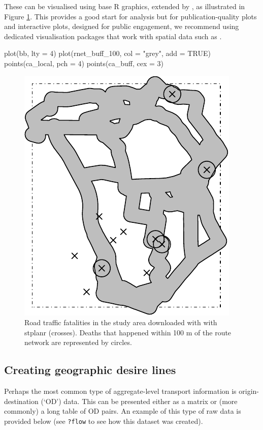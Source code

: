 These can be visualised using base R graphics, extended by ,
as illustrated in Figure \ref{fig:fats}. This provides a good start for
analysis but for publication-quality plots and interactive plots,
designed for public engagement, we recommend using dedicated
visualisation packages that work with spatial data such as
.

\begin{Schunk}
\begin{Sinput}
plot(bb, lty = 4)
plot(rnet_buff_100, col = "grey", add = TRUE)
points(ca_local, pch = 4)
points(ca_buff, cex = 3)
\end{Sinput}
\begin{figure}

{\centering \includegraphics[width=0.5\linewidth]{fats-1}

}

\caption[Road traffic fatalities in the study area downloaded with with stplanr (crosses)]{Road traffic fatalities in the study area downloaded with with stplanr (crosses). Deaths that happened within 100 m of the route network are represented by circles.}\label{fig:fats}
\end{figure}
\end{Schunk}

\subsection{Creating geographic desire
lines}\label{creating-geographic-desire-lines}

Perhaps the most common type of aggregate-level transport information is
origin-destination (`OD') data. This can be presented either as a matrix
or (more commonly) a long table of OD pairs. An example of this type of
raw data is provided below (see \texttt{?flow} to see how this dataset
was created).

